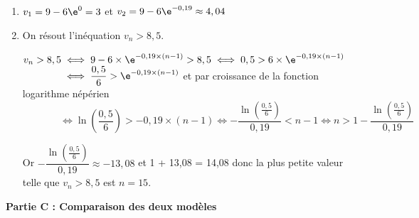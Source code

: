 \medskip

\begin{enumerate}
\item 
$v_1=9-6\e^{0}=3$ et $v_2=9-6\e^{-0,19}\approx 4,04$

\item On résout l'inéquation $v_n > 8,5$.

$v_n > 8,5
\iff
9 - 6 \times \e^{-0,19\times(n - 1)} > 8,5
\iff 
0,5 > 6 \times \e^{-0,19\times(n - 1)}
$\\

$\phantom{v_n > 8,5}\iff\dfrac{0,5}{6} > \e^{-0,19\times(n - 1)}$ et par croissance de la fonction logarithme népérien\\
$\phantom{v_n > 8,5}
\iff
\ln \left (\dfrac{0,5}{6}\right ) > -0,19\times (n-1)
\iff
-\dfrac{\ln \left (\frac{0,5}{6}\right )}{0,19} < n - 1 \iff n > 1 -\dfrac{\ln \left (\frac{0,5}{6}\right )}{0,19}$

Or $-\dfrac{\ln \left (\frac{0,5}{6}\right )}{0,19}\approx -13,08$ et 1 + 13,08 = 14,08 donc la plus petite valeur telle que $v_n > 8,5$ est $n = 15$.

\end{enumerate}

\bigskip

\textbf{Partie C : Comparaison des deux modèles}

\medskip

